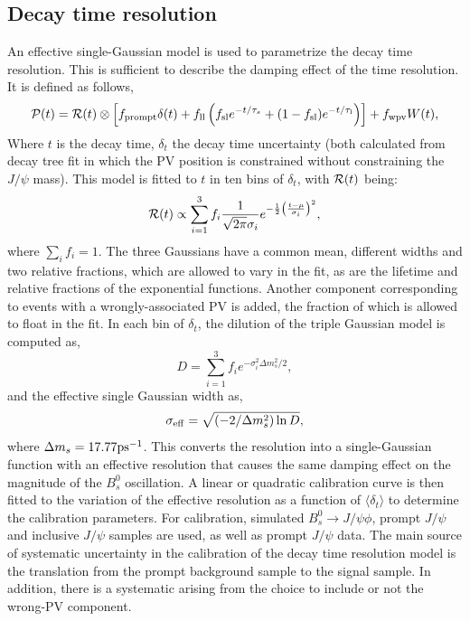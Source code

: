 \subsection{Decay time resolution}
An effective single-Gaussian model is used to parametrize the decay time resolution. This is sufficient to describe the damping effect of the time resolution. It is defined as follows, %
\begin{equation}
    \mathcal{P}(t) = \mathcal{R}(t) \otimes
    \left[ f_{\mathrm{prompt}}\delta(t) + 
    f_{\mathrm{ll}} \left(f_{\mathrm{sl}}e^{- t / \tau_s} + (1 - f_{\rm sl})e^{- t / \tau_{\rm l}}\right)
    \right] + f_{\mathrm{wpv}} W(t),
    \label{eq:decay_time_pdf}
\end{equation}
Where $t$ is the decay time, $\delta_t$ the decay time uncertainty (both calculated from  decay tree fit in which the PV position is constrained without constraining the $J/\psi$ mass). This model is fitted to $t$ in ten bins of $\delta_t$, with ${\cal R}(t)$ being:
        \begin{equation}
            {\cal R}(t) \propto \sum_{i=1}^{3} f_i \frac{1}{\sqrt{2\pi}\sigma_i} e ^{-\frac{1}{2}\left(\frac{t-\mu}{\sigma_i}\right)^2},
        \label{eq:decay_time_res_model}
        \end{equation}
where $\sum_i f_i =1$.
The three Gaussians have a common mean, different widths and two relative fractions, which are allowed to vary in the fit, as are the lifetime and relative fractions of the exponential functions. Another component corresponding to events with a wrongly-associated PV is added, the fraction of which is allowed to float in the fit. In each bin of $\delta_t$, the dilution of the triple Gaussian model is computed as,
\begin{equation}
    \label{eqn:time_dilution_tr}
    D = \sum_{i=1}^{3}f_i e^{-\sigma_i^2\Delta m_s^2/2},
\end{equation}
and the effective single Gaussian width as,
\begin{equation}
    \label{eqn:time_eff_res_tr}
    \sigma_{\rm eff} = \sqrt{(-2/\Delta m_s^2)\ln D},
\end{equation}
where $\Delta m_s = 17.77 \rm ps^{-1}$. This converts the resolution into a single-Gaussian function with an effective resolution that causes the same damping effect on the magnitude of the $B_s^0$ oscillation. A linear or quadratic calibration curve is then fitted to the variation of the effective resolution as a function of $\langle\delta_t\rangle$ to determine the calibration parameters. 
For calibration, simulated $B_s^0 \rightarrow J/\psi \phi$, prompt $J/\psi$ and inclusive $J/\psi$ samples are used, as well as prompt $J/\psi$ data. 
The main source of systematic uncertainty in the calibration of the decay time resolution model is the translation from the prompt background sample to the signal sample. In addition, there is a systematic arising from the choice to include or not the
wrong-PV component.


